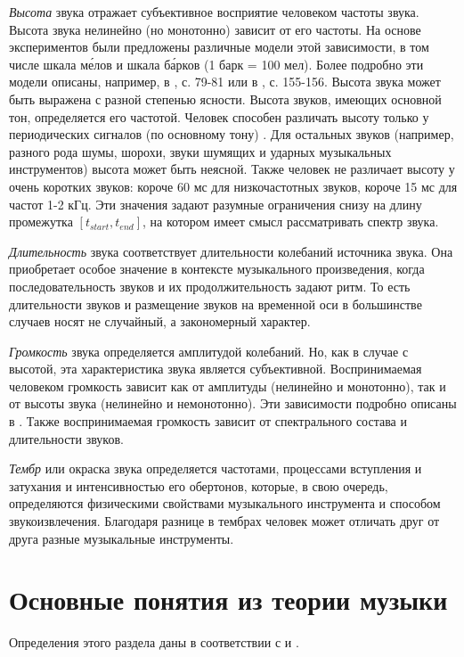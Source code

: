 \emph{Высота} звука отражает субъективное восприятие человеком частоты звука.
Высота звука нелинейно (но монотонно) зависит от его частоты. На основе
экспериментов были предложены различные модели этой зависимости, в том числе
шкала м\'{е}лов и шкала б\'{а}рков (1 барк = 100 мел). Более подробно эти модели
описаны, например, в \cite{Lerch2012}, с. 79-81 или в \cite{Aldoshina2006}, с.
155-156. Высота звука может быть выражена с разной степенью ясности. Высота
звуков, имеющих основной тон, определяется его частотой. Человек способен
различать высоту только у периодических сигналов (по основному тону)
\cite{Aldoshina2006}. Для остальных звуков (например, разного рода шумы, шорохи,
звуки шумящих и ударных музыкальных инструментов) высота может быть неясной.
Также человек не различает высоту у очень коротких звуков: короче 60 мс для
низкочастотных звуков, короче 15 мс для частот 1-2 кГц. Эти значения задают
разумные ограничения снизу на длину промежутка $[t_{start}, t_{end}]$, на
котором имеет смысл рассматривать спектр звука.

\emph{Длительность} звука соответствует длительности колебаний источника звука.
Она приобретает особое значение в контексте музыкального произведения, когда
последовательность звуков и их продолжительность задают ритм. То есть
длительности звуков и размещение звуков на временной оси в большинстве случаев
носят не случайный, а закономерный характер.

\emph{Громкость} звука определяется амплитудой колебаний. Но, как в случае с
высотой, эта характеристика звука является субъективной. Воспринимаемая
человеком громкость зависит как от амплитуды (нелинейно и монотонно), так и от
высоты звука (нелинейно и немонотонно). Эти зависимости подробно описаны в
\cite{Fastl2007}. Также воспринимаемая громкость зависит от спектрального
состава и длительности звуков.

\emph{Тембр} или окраска звука определяется частотами, процессами вступления и
затухания и интенсивностью его обертонов, которые, в свою очередь, определяются
физическими свойствами музыкального инструмента и способом звукоизвлечения.
Благодаря разнице в тембрах человек может отличать друг от друга разные
музыкальные инструменты.

\section{Основные понятия из теории музыки} \label{sectT_music}

Определения этого раздела даны в соответствии с \cite{Vahromeev1962} и
\cite{Sposobin2012}.

